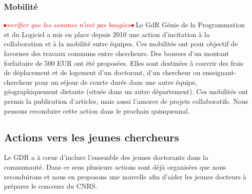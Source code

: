\documentclass[11pt]{article}
\newcommand{\mynote}[3][black]{\textcolor{#1}{\fbox{\bfseries\sffamily\scriptsize{#2}}
{\small$\blacktriangleright$\textsf{\emph{#3}}$\blacktriangleleft$}}}
\newcommand{\TODO}[1]{\mynote[red]{TODO}{#1}}
\begin{document}
\subsubsection{Mobilité}
\TODO{verifier que les sommes n'ont pas bougées}
Le GdR Génie de la Programmation et du Logiciel a mis en place depuis 2010 une action d'incitation à la collaboration et à la mobilité entre équipes. Ces mobilités ont pour objectif de favoriser des travaux communs
entre chercheurs. Des bourses d'un montant forfaitaire de 500 EUR  ont été proposées. Elles sont destinées à couvrir des frais de déplacement et de logement d'un doctorant, d'un chercheur ou enseignant-chercheur pour un séjour de courte durée dans une autre équipe, géographiquement distante (située dans un autre département). Ces mobilités ont permis la publication d'articles, mais aussi l'amorce de projets collaboratifs. Nous pensons reconduire cette action dans le prochain quinquennal.


\subsection{Actions vers les jeunes chercheurs}

Le GDR a à c{\oe}ur d'inclure l'ensemble des jeunes doctorants dans la
communauté. Dans ce sens plusieurs actions sont déjà organisées que nous reconduirons et nous en proposons une nouvelle afin d'aider les jeunes docteurs à préparer le concours du CNRS.
\end{document}
